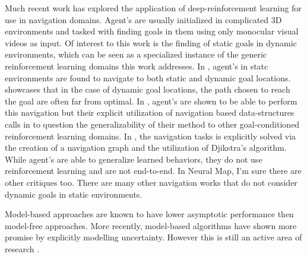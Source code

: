 Much recent work has explored the application of deep-reinforcement
learning for use in navigation domains. Agent's are usually initialized
in complicated 3D environments and tasked with finding goals in them
using only monocular visual videos as input. Of interest to this work is
the finding of static goals in dynamic environments, which can be seen
as a specialized instance of the generic reinforcement learning domains
this work addresses. In \citet{mirowski2016learning}, agent's in statc
environments are found to navigate to both static and dynamic goal
locations.  \citet{dhiman2018critical} showcases that in the case of
dynamic goal locations, the path chosen to reach the goal are often far
from optimal. In \citet{gupta2017cognitive},  agent's are shown to be
able to perform this navigation but their explicit utilization of
navigation based data-structures calls in to question the
generalizability of their method to other goal-conditioned reinforcement
learning domains. In , the navigation tasks is
explicitly solved via the creation of a navigation graph and the
utilization of Djikstra's algorithm. While agent's are able to
generalize learned behaviors, they do not use reinforcement learning and
are not end-to-end. In Neural Map, I'm sure there are other critiques
too. There are many other navigation works that do not consider dynamic
goals in static environments. 

Model-based approaches are known to have lower asymptotic performance
then model-free approaches. More recently, model-based algorithms have
shown more promise by explicitly modelling uncertainty. However this is
still an active area of research \cite{lakshminarayanan2017simple,
kurutach2018model,zhang2018solar}.

%




